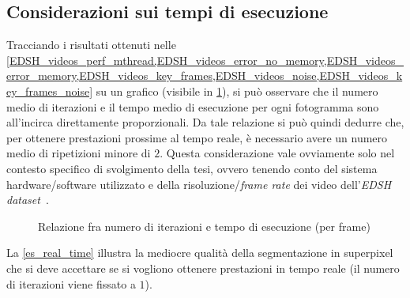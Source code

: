 \documentclass[12pt,a4paper,oneside]{article}
\begin{document}
\subsection{Considerazioni sui tempi di esecuzione}
Tracciando i risultati ottenuti nelle \cref{EDSH_videos_perf_mthread,EDSH_videos_error_no_memory,EDSH_videos_error_memory,EDSH_videos_key_frames,EDSH_videos_noise,EDSH_videos_key_frames_noise} su un grafico (visibile in \cref{Iterazioni_vs_tempo}), si può osservare che il numero medio di iterazioni e il tempo medio di esecuzione per ogni fotogramma sono all'incirca direttamente proporzionali. Da tale relazione si può quindi dedurre che, per ottenere prestazioni prossime al tempo reale, è necessario avere un numero medio di ripetizioni minore di $2$. Questa considerazione vale ovviamente solo nel contesto specifico di svolgimento della tesi, ovvero tenendo conto del sistema hardware/software utilizzato e della risoluzione/\textit{frame rate} dei video dell'\textit{EDSH dataset}~\cite{KITANI_HAND_DETECTION}.
\begin{figure}[!htb]
\centering
{}
\captionsetup{justification=centering}
\caption{Relazione fra numero di iterazioni e tempo di esecuzione (per frame)}\label{Iterazioni_vs_tempo}
\end{figure}

\noindent La \cref{es_real_time} illustra la mediocre qualità della segmentazione in superpixel che si deve accettare se si vogliono ottenere prestazioni in tempo reale (il numero di iterazioni viene fissato a $1$).
\end{document}
